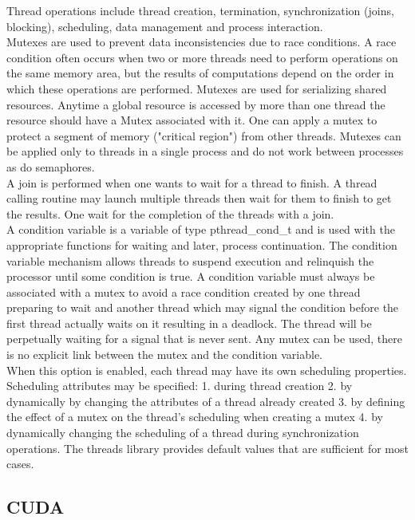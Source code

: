 \documentclass[10pt,twocolumn,letterpaper]{article}
\begin{document}
Thread operations include thread creation, termination, synchronization (joins, blocking), scheduling, data management and process interaction.\\
Mutexes are used to prevent data inconsistencies due to race conditions. A race condition often occurs when two or more threads need to perform operations on the same memory area, but the results of computations depend on the order in which these operations are performed. Mutexes are used for serializing shared resources. Anytime a global resource is accessed by more than one thread the resource should have a Mutex associated with it. One can apply a mutex to protect a segment of memory ("critical region") from other threads. Mutexes can be applied only to threads in a single process and do not work between processes as do semaphores.\\
A join is performed when one wants to wait for a thread to finish. A thread calling routine may launch multiple threads then wait for them to finish to get the results. One wait for the completion of the threads with a join.\\ A condition variable is a variable of type pthread_cond_t and is used with the appropriate functions for waiting and later, process continuation. The condition variable mechanism allows threads to suspend execution and relinquish the processor until some condition is true. A condition variable must always be associated with a mutex to avoid a race condition created by one thread preparing to wait and another thread which may signal the condition before the first thread actually waits on it resulting in a deadlock. The thread will be perpetually waiting for a signal that is never sent. Any mutex can be used, there is no explicit link between the mutex and the condition variable. \\

When this option is enabled, each thread may have its own scheduling properties. Scheduling attributes may be specified:
1.	during thread creation
2.	by dynamically by changing the attributes of a thread already created
3.	by defining the effect of a mutex on the thread's scheduling when creating a mutex
4.	by dynamically changing the scheduling of a thread during synchronization operations.
The threads library provides default values that are sufficient for most cases.


\subsection{CUDA}
\end{document}
